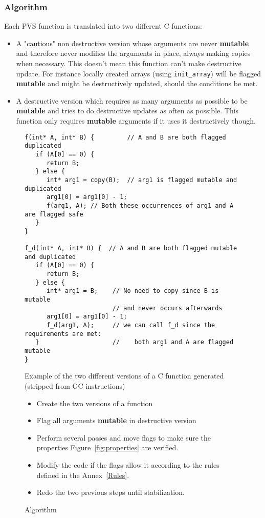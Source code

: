\documentclass[12pt,a4paper]{article}
\newcommand{\cl}[1]{\texttt{#1}}
\newcommand{\bang}{ \textbf{ mutable } }
\begin{document}
\subsubsection{Algorithm}

Each PVS function is translated into two different C functions:
\begin{itemize}
\item A "cautious" non destructive version whose arguments are never \bang and therefore never modifies the arguments in place, always making copies when necessary. This doesn't mean this function can't make destructive update. For instance locally created arrays (using \cl{init\_array}) will be flagged \bang and might be destructively updated, should the conditions be met.
\item A destructive version which requires as many arguments as possible to be \bang and tries to do destructive updates as often as possible. This function only requires \bang arguments if it uses it destructively though.
\end{itemize}


\begin{figure}
\begin{lstlisting}
f(int* A, int* B) {         // A and B are both flagged duplicated
   if (A[0] == 0) {
      return B;
   } else {
      int* arg1 = copy(B);  // arg1 is flagged mutable and duplicated
      arg1[0] = arg1[0] - 1;
      f(arg1, A); // Both these occurrences of arg1 and A are flagged safe
   }
}

f_d(int* A, int* B) {  // A and B are both flagged mutable and duplicated
   if (A[0] == 0) {
      return B;
   } else {
      int* arg1 = B;    // No need to copy since B is mutable
                        // and never occurs afterwards
      arg1[0] = arg1[0] - 1;
      f_d(arg1, A);     // we can call f_d since the requirements are met:
   }                    //    both arg1 and A are flagged mutable
}
\end{lstlisting}
\caption{Example of the two different versions of a C function generated (stripped from GC instructions)}
\end{figure}




\begin{figure}
\begin{itemize}
\item Create the two versions of a function
\item Flag all arguments \bang in destructive version
\item Perform several passes and move flags to make sure the properties Figure~\ref{fig:properties} are verified.
\item Modify the code if the flags allow it according to the rules defined in the Annex~\ref{Rules}.
\item Redo the two previous steps until stabilization.
\end{itemize}
\caption{Algorithm}
\end{figure}
\end{document}

